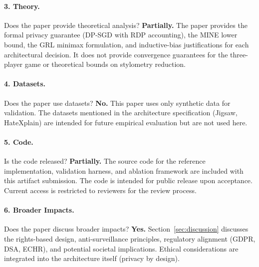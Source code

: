 \documentclass{article}
\begin{document}
\paragraph{3. Theory.}
Does the paper provide theoretical analysis?
\textbf{Partially.}
The paper provides the formal privacy guarantee (DP-SGD with RDP
accounting), the MINE lower bound, the GRL minimax formulation, and
inductive-bias justifications for each architectural decision. It does
not provide convergence guarantees for the three-player game or
theoretical bounds on stylometry reduction.

\paragraph{4. Datasets.}
Does the paper use datasets?
\textbf{No.}
This paper uses only synthetic data for validation. The datasets
mentioned in the architecture specification (Jigsaw, HateXplain) are
intended for future empirical evaluation but are not used here.

\paragraph{5. Code.}
Is the code released?
\textbf{Partially.}
The source code for the reference implementation, validation harness,
and ablation framework are included with this artifact submission. The
code is intended for public release upon acceptance. Current access is
restricted to reviewers for the review process.

\paragraph{6. Broader Impacts.}
Does the paper discuss broader impacts?
\textbf{Yes.}
Section~\ref{sec:discussion} discusses the rights-based design,
anti-surveillance principles, regulatory alignment (GDPR, DSA, ECHR),
and potential societal implications. Ethical considerations are
integrated into the architecture itself (privacy by design).
\end{document}
